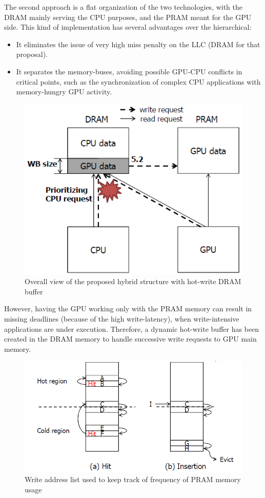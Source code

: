 \documentclass[12pt,journal,compsoc]{IEEEtran}
\begin{document}
The second approach is a flat organization of the two technologies, with the DRAM mainly serving the CPU purposes, and the PRAM meant for the GPU side. This kind of implementation has several advantages over the hierarchical:
\begin{itemize}
\item{It eliminates the issue of very high miss penalty on the LLC (DRAM for that proposal).}
\item{It separates the memory-buses, avoiding possible GPU-CPU conflicts in critical points, such as the synchronization of complex CPU applications with memory-hungry GPU activity.}
\end{itemize}
\begin{figure}[H]
	\centering
	\includegraphics[width = 8 cm]{graphics/StructureWithBuffer.PNG}
	\caption{Overall view of the proposed hybrid structure with hot-write DRAM buffer}\label{fig:structurebuff}
\end{figure} 
However, having the GPU working only with the PRAM memory can result in missing deadlines (because of the high write-latency), when write-intensive applications are under execution. Therefore, a dynamic hot-write buffer has been created in the DRAM memory to handle successive write requests to GPU main memory. 
\begin{figure}[H]
	\centering
	\includegraphics[width = 9 cm]{graphics/hot-write.PNG}
	\caption{Write address list used to keep track of frequency of PRAM memory usage }\label{fig:hotwrite}
\end{figure} 
\end{document}
